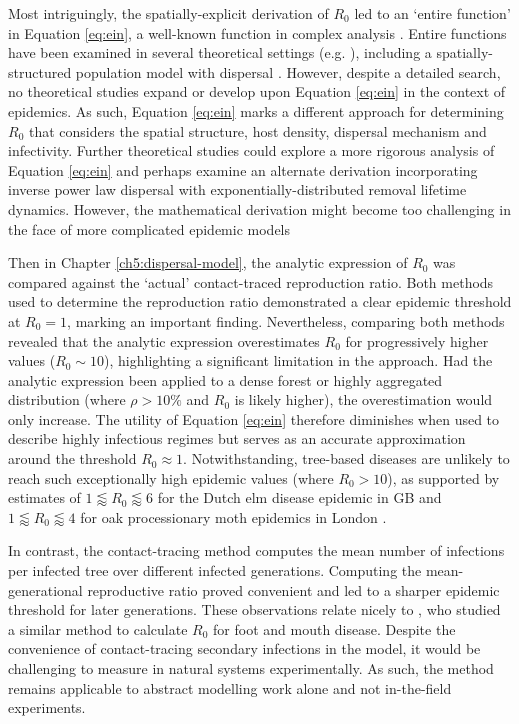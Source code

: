 Most intriguingly, the spatially-explicit derivation of $R_0$ led to an `entire function' in Equation \ref{eq:ein}, a well-known function in complex analysis \cite{abramowitz1948handbook}. Entire functions have been examined in several theoretical settings (e.g. \cite{littmann2005entire, hryniv2009zeros, sixsmith2011entire}), including a spatially-structured population model with dispersal \cite{zhang2017non}. However, despite a detailed search, no theoretical studies expand or develop upon Equation \ref{eq:ein} in the context of epidemics. 
As such, Equation \ref{eq:ein} marks a different approach for determining $R_0$ that considers the spatial structure, host density, dispersal mechanism and infectivity. Further theoretical studies could explore a more rigorous analysis of Equation \ref{eq:ein} and perhaps examine an alternate derivation incorporating inverse power law dispersal with exponentially-distributed removal lifetime dynamics. However, the mathematical derivation might become too challenging in the face of more complicated epidemic models

Then in Chapter \ref{ch5:dispersal-model}, the analytic expression of $R_0$ was compared against the `actual' contact-traced reproduction ratio. Both methods used to determine the reproduction ratio demonstrated a clear epidemic threshold at $R_0=1$, marking an important finding. Nevertheless, comparing both methods revealed that the analytic expression overestimates $R_0$ for progressively higher values ($R_0 \sim 10$), highlighting a significant limitation in the approach. 
Had the analytic expression been applied to a dense forest or highly aggregated distribution (where $\rho >10\%$ and $R_0$ is likely higher), the overestimation would only increase.
The utility of Equation \ref{eq:ein} therefore diminishes when used to describe highly infectious regimes but serves as an accurate approximation around the threshold $R_0 \approx 1$. Notwithstanding,
tree-based diseases are unlikely to reach such exceptionally high epidemic values (where $R_0>10$), as supported by estimates of $1 \lessapprox R_0 \lessapprox 6$ for the Dutch elm disease epidemic in GB \cite{swinton1996dutch} and $1 \lessapprox R_0 \lessapprox 4$ for oak processionary moth epidemics in London \cite{wadkin2022inference}.

In contrast, the contact-tracing method computes the mean number of infections per infected tree over different infected generations.
Computing the mean-generational reproductive ratio proved convenient and led to a sharper epidemic threshold for later generations. These observations relate nicely to \cite{R0-perc-ref}, who studied a similar method to calculate $R_0$ for foot and mouth disease.
Despite the convenience of contact-tracing secondary infections in the model, it would be challenging to measure in natural systems experimentally.
As such, the method remains applicable to abstract modelling work alone and not in-the-field experiments.

